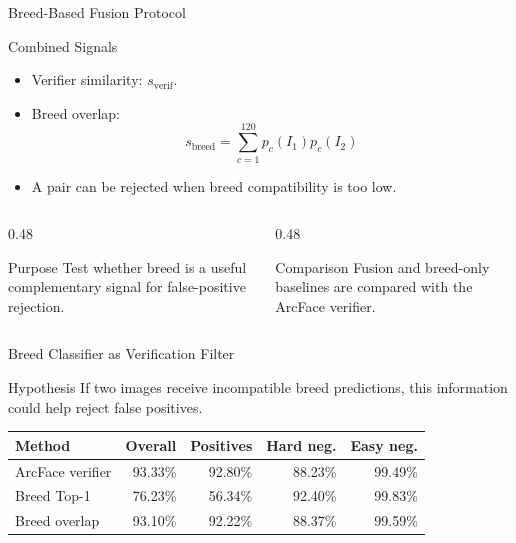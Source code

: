 \documentclass[aspectratio=169,11pt]{beamer}
\begin{document}
\begin{frame}{Breed-Based Fusion Protocol}
  \begin{block}{Combined Signals}
    \begin{itemize}
      \item Verifier similarity: $s_{\text{verif}}$.
      \item Breed overlap:
      \[
        s_{\text{breed}}=\sum_{c=1}^{120}p_c(I_1)p_c(I_2)
      \]
      \item A pair can be rejected when breed compatibility is too low.
    \end{itemize}
  \end{block}

  \begin{columns}[T,onlytextwidth]
    \begin{column}{0.48\textwidth}
      \begin{alertblock}{Purpose}
        Test whether breed is a useful complementary signal for false-positive rejection.
      \end{alertblock}
    \end{column}
    \begin{column}{0.48\textwidth}
      \begin{block}{Comparison}
        Fusion and breed-only baselines are compared with the ArcFace verifier.
      \end{block}
    \end{column}
  \end{columns}
\end{frame}

\begin{frame}{Breed Classifier as Verification Filter}
  \begin{block}{Hypothesis}
    If two images receive incompatible breed predictions, this information could help reject false positives.
  \end{block}

  \begin{table}
    \centering
    \small
    \begin{tabular}{lrrrr}
      \toprule
      Method & Overall & Positives & Hard neg. & Easy neg. \\
      \midrule
      ArcFace verifier & 93.33\% & 92.80\% & 88.23\% & 99.49\% \\
      Breed Top-1 & 76.23\% & 56.34\% & 92.40\% & 99.83\% \\
      Breed overlap & 93.10\% & 92.22\% & 88.37\% & 99.59\% \\
      \bottomrule
    \end{tabular}
  \end{table}
\end{frame}
\end{document}
